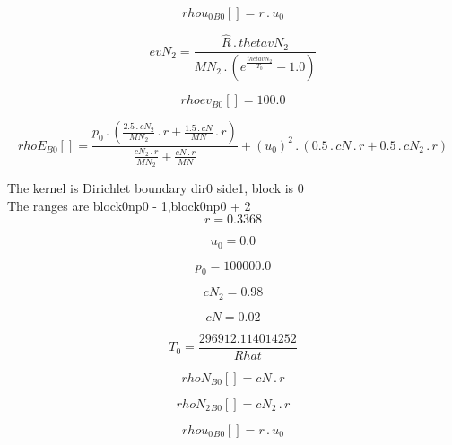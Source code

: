 \documentclass{article}
\begin{document}
\begin{dmath}{rhou_{0}{_{B0}}}[{}] = r \,.\, u_{0}\end{dmath}

\begin{dmath}evN_{2} = \frac{\hat{R} \,.\, thetavN_{2}}{MN_{2} \,.\, \left(e^{\frac{thetavN_{2}}{T_{0}}} - 1.0\right)}\end{dmath}

\begin{dmath}{rhoev{_{B0}}}[{}] = 100.0\end{dmath}

\begin{dmath}{rhoE{_{B0}}}[{}] = \frac{p_{0} \,.\, \left(\frac{2.5 \,.\, cN_{2}}{MN_{2}} \,.\, r + \frac{1.5 \,.\, cN}{MN} \,.\, r\right)}{\frac{cN_{2} \,.\, r}{MN_{2}} + \frac{cN \,.\, r}{MN}} + \left(u_{0} \right)^{2} \,.\, \left(0.5 \,.\, cN \,.\, 
r + 0.5 \,.\, cN_{2} \,.\, r\right)\end{dmath}

\noindent The kernel is Dirichlet boundary dir0 side1, block is 0\\\noindent The ranges are block0np0 - 1,block0np0 + 2\\\begin{dmath}r = 0.3368\end{dmath}

\begin{dmath}u_{0} = 0.0\end{dmath}

\begin{dmath}p_{0} = 100000.0\end{dmath}

\begin{dmath}cN_{2} = 0.98\end{dmath}

\begin{dmath}cN = 0.02\end{dmath}

\begin{dmath}T_{0} = \frac{296912.114014252}{Rhat}\end{dmath}

\begin{dmath}{rhoN{_{B0}}}[{}] = cN \,.\, r\end{dmath}

\begin{dmath}{rhoN_{2}{_{B0}}}[{}] = cN_{2} \,.\, r\end{dmath}

\begin{dmath}{rhou_{0}{_{B0}}}[{}] = r \,.\, u_{0}\end{dmath}
\end{document}
